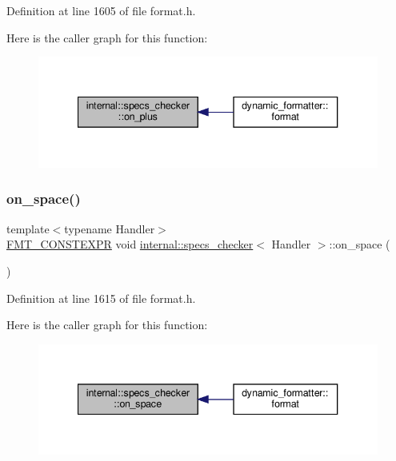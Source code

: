 Definition at line 1605 of file format.\+h.

Here is the caller graph for this function\+:
\nopagebreak
\begin{figure}[H]
\begin{center}
\leavevmode
\includegraphics[width=340pt]{classinternal_1_1specs__checker_a12d7b0e358cb4fa37ea1e743fc91df62_icgraph}
\end{center}
\end{figure}
\mbox{\label{classinternal_1_1specs__checker_ad3ad96ca1b6ccf5495de4aecbb1a4d7a}} 
\subsubsection{\texorpdfstring{on\+\_\+space()}{on\_space()}}
{\footnotesize\ttfamily template$<$typename Handler$>$ \\
\hyperlink{core_8h_a69201cb276383873487bf68b4ef8b4cd}{F\+M\+T\+\_\+\+C\+O\+N\+S\+T\+E\+X\+PR} void \hyperlink{classinternal_1_1specs__checker}{internal\+::specs\+\_\+checker}$<$ Handler $>$\+::on\+\_\+space (\begin{DoxyParamCaption}{ }\end{DoxyParamCaption})\hspace{0.3cm}{\ttfamily [inline]}}



Definition at line 1615 of file format.\+h.

Here is the caller graph for this function\+:
\nopagebreak
\begin{figure}[H]
\begin{center}
\leavevmode
\includegraphics[width=340pt]{classinternal_1_1specs__checker_ad3ad96ca1b6ccf5495de4aecbb1a4d7a_icgraph}
\end{center}
\end{figure}
\mbox{\label{classinternal_1_1specs__checker_a424213bfc129a687ad3dd6d6e872139f}} 
